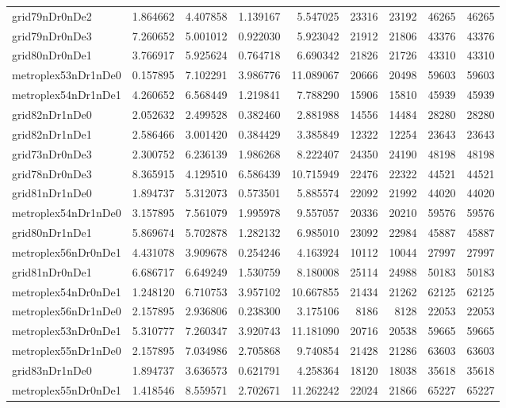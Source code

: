 \begin{longtable}{|l|r|r|r|r|r|r|r|r|}
grid79nDr0nDe2 & 1.864662 & 4.407858 & 1.139167 & 5.547025 & 23316 & 23192 & 46265 & 46265 \\
grid79nDr0nDe3 & 7.260652 & 5.001012 & 0.922030 & 5.923042 & 21912 & 21806 & 43376 & 43376 \\
grid80nDr0nDe1 & 3.766917 & 5.925624 & 0.764718 & 6.690342 & 21826 & 21726 & 43310 & 43310 \\
metroplex53nDr1nDe0 & 0.157895 & 7.102291 & 3.986776 & 11.089067 & 20666 & 20498 & 59603 & 59603 \\
metroplex54nDr1nDe1 & 4.260652 & 6.568449 & 1.219841 & 7.788290 & 15906 & 15810 & 45939 & 45939 \\
grid82nDr1nDe0 & 2.052632 & 2.499528 & 0.382460 & 2.881988 & 14556 & 14484 & 28280 & 28280 \\
grid82nDr1nDe1 & 2.586466 & 3.001420 & 0.384429 & 3.385849 & 12322 & 12254 & 23643 & 23643 \\
grid73nDr0nDe3 & 2.300752 & 6.236139 & 1.986268 & 8.222407 & 24350 & 24190 & 48198 & 48198 \\
grid78nDr0nDe3 & 8.365915 & 4.129510 & 6.586439 & 10.715949 & 22476 & 22322 & 44521 & 44521 \\
grid81nDr1nDe0 & 1.894737 & 5.312073 & 0.573501 & 5.885574 & 22092 & 21992 & 44020 & 44020 \\
metroplex54nDr1nDe0 & 3.157895 & 7.561079 & 1.995978 & 9.557057 & 20336 & 20210 & 59576 & 59576 \\
grid80nDr1nDe1 & 5.869674 & 5.702878 & 1.282132 & 6.985010 & 23092 & 22984 & 45887 & 45887 \\
metroplex56nDr0nDe1 & 4.431078 & 3.909678 & 0.254246 & 4.163924 & 10112 & 10044 & 27997 & 27997 \\
grid81nDr0nDe1 & 6.686717 & 6.649249 & 1.530759 & 8.180008 & 25114 & 24988 & 50183 & 50183 \\
metroplex54nDr0nDe1 & 1.248120 & 6.710753 & 3.957102 & 10.667855 & 21434 & 21262 & 62125 & 62125 \\
metroplex56nDr1nDe0 & 2.157895 & 2.936806 & 0.238300 & 3.175106 & 8186 & 8128 & 22053 & 22053 \\
metroplex53nDr0nDe1 & 5.310777 & 7.260347 & 3.920743 & 11.181090 & 20716 & 20538 & 59665 & 59665 \\
metroplex55nDr1nDe0 & 2.157895 & 7.034986 & 2.705868 & 9.740854 & 21428 & 21286 & 63603 & 63603 \\
grid83nDr1nDe0 & 1.894737 & 3.636573 & 0.621791 & 4.258364 & 18120 & 18038 & 35618 & 35618 \\
metroplex55nDr0nDe1 & 1.418546 & 8.559571 & 2.702671 & 11.262242 & 22024 & 21866 & 65227 & 65227 \\

\end{longtable}
